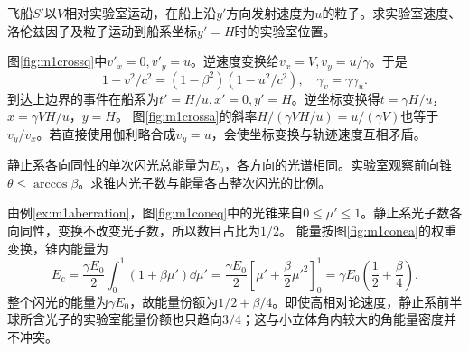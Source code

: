 \begin{exercise}\label{ex:m1crossvelocity}
飞船$S'$以$V$相对实验室运动，在船上沿$y'$方向发射速度为$u$的粒子。求实验室速度、洛伦兹因子及粒子运动到船系坐标$y'=H$时的实验室位置。
\end{exercise}
\begin{solution}
图\ref{fig:m1crossq}中$v'_x=0,v'_y=u$。逆速度变换给$v_x=V,v_y=u/\gamma$。于是
\[
 1-v^2/c^2=(1-\beta^2)(1-u^2/c^2),\quad \gamma_v=\gamma\gamma_u.
\]
到达上边界的事件在船系为$t'=H/u,x'=0,y'=H$。逆坐标变换得$t=\gamma H/u$，$x=\gamma VH/u$，$y=H$。
图\ref{fig:m1crossa}的斜率$H/(\gamma VH/u)=u/(\gamma V)$也等于$v_y/v_x$。若直接使用伽利略合成$v_y=u$，会使坐标变换与轨迹速度互相矛盾。
\end{solution}

\begin{exercise}\label{ex:m1coneenergy}
静止系各向同性的单次闪光总能量为$E_0$，各方向的光谱相同。实验室观察前向锥$\theta\leq\arccos\beta$。求锥内光子数与能量各占整次闪光的比例。
\end{exercise}
\begin{solution}
由例\ref{ex:m1aberration}，图\ref{fig:m1coneq}中的光锥来自$0\leq\mu'\leq1$。静止系光子数各向同性，变换不改变光子数，所以数目占比为$1/2$。
能量按图\ref{fig:m1conea}的权重变换，锥内能量为
\[
 E_c=\frac{\gamma E_0}{2}\int_0^1(1+\beta\mu')\dd\mu'
 =\frac{\gamma E_0}{2}\left[\mu'+\frac\beta2\mu'^2\right]_0^1
 =\gamma E_0\left(\frac12+\frac\beta4\right).
\]
整个闪光的能量为$\gamma E_0$，故能量份额为$1/2+\beta/4$。即使高相对论速度，静止系前半球所含光子的实验室能量份额也只趋向$3/4$；这与小立体角内较大的角能量密度并不冲突。
\end{solution}


